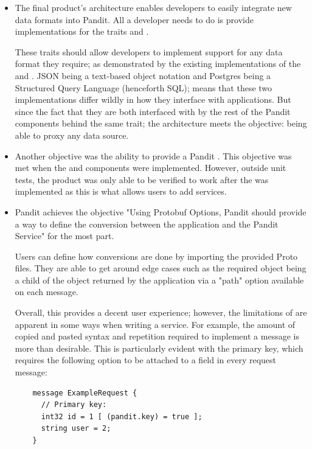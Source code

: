 \documentclass[a4paper,12pt]{report}
\begin{document}
\begin{itemize}
    \item The final product's architecture enables developers to easily integrate new data formats into Pandit. 
    All a developer needs to do is provide implementations for the traits  and .
    
    These traits should allow developers to implement support for any data format they require; as demonstrated by the existing implementations of the  and . 
    JSON being a text-based object notation and Postgres being a Structured Query Language (henceforth SQL); means that these two implementations differ wildly in how they interface with applications.
    But since the fact that they are both interfaced with by the rest of the Pandit components behind the same trait; the architecture meets the objective: being able to proxy any data source.
    
    \item Another objective was the ability to provide a Pandit . This objective was met when the  and  components were implemented. 
    However, outside unit tests, the product was only able to be verified to work after the  was implemented as this is what allows users to add services.
    
    \item Pandit achieves the objective "Using Protobuf Options, Pandit should provide a way to define the conversion between the application and the Pandit Service" for the most part.
    
    Users can define how conversions are done by importing the provided Proto files. 
    They are able to get around edge cases such as the required object being a child of the object returned by the application via a "path" option available on each message.
    
    Overall, this provides a decent user experience; however, the limitations of  are apparent in some ways when writing a service. 
    For example, the amount of copied and pasted syntax and repetition required to implement a message is more than desirable.
    This is particularly evident with the primary key, which requires the following option to be attached to a field in every request message:
    \begin{lstlisting}
    message ExampleRequest {
      // Primary key:
      int32 id = 1 [ (pandit.key) = true ];
      string user = 2;
    }
    \end{lstlisting}
    

\end{itemize}
\end{document}
